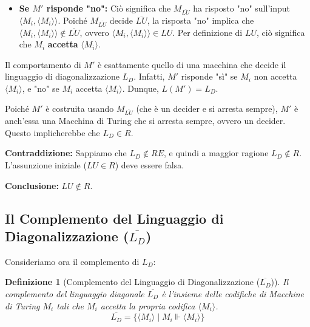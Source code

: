 \documentclass[a4paper]{article}
\makeatletter
\newtheorem{definition}{Definizione}[section] %
\renewenvironment{proof}[1][\proofname]{\par
  \pushQED{\qed}%
  \normalfont \topsep6\p@\@plus6\p@\relax
  \trivlist
  \item[\hskip\labelsep
        \bfseries
    #1\@addpunct{.}]\ignorespaces
}{%
  \popQED\endtrivlist\@endpefalse
}
\makeatother
\begin{document}
\begin{proof}
\begin{itemize}
    Poiché $M_{\overline{LU}}$ decide $\overline{LU}$, la risposta "sì" implica che $\langle M_i, \langle M_i \rangle \rangle \in \overline{LU}$.
    Per definizione di $\overline{LU}$, ciò significa che $M_i$ \textbf{non accetta} $\langle M_i \rangle$.
    \item \textbf{Se $M'$ risponde "no":}
    Ciò significa che $M_{\overline{LU}}$ ha risposto "no" sull'input $\langle M_i, \langle M_i \rangle \rangle$.
    Poiché $M_{\overline{LU}}$ decide $\overline{LU}$, la risposta "no" implica che $\langle M_i, \langle M_i \rangle \rangle \notin \overline{LU}$, ovvero $\langle M_i, \langle M_i \rangle \rangle \in LU$.
    Per definizione di $LU$, ciò significa che $M_i$ \textbf{accetta} $\langle M_i \rangle$.
\end{itemize}
Il comportamento di $M'$ è esattamente quello di una macchina che decide il linguaggio di diagonalizzazione $L_D$. Infatti, $M'$ risponde "sì" se $M_i$ non accetta $\langle M_i \rangle$, e "no" se $M_i$ accetta $\langle M_i \rangle$. Dunque, $L(M') = L_D$.

Poiché $M'$ è costruita usando $M_{\overline{LU}}$ (che è un decider e si arresta sempre), $M'$ è anch'essa una Macchina di Turing che si arresta sempre, ovvero un decider. Questo implicherebbe che $L_D \in R$.

\textbf{Contraddizione:} Sappiamo che $L_D \notin RE$, e quindi a maggior ragione $L_D \notin R$.
L'assunzione iniziale ($LU \in R$) deve essere falsa.

\textbf{Conclusione:} $LU \notin R$.
\end{proof}

\subsection{Il Complemento del Linguaggio di Diagonalizzazione ($\overline{L_D}$)}
Consideriamo ora il complemento di $L_D$:
\begin{definition}[Complemento del Linguaggio di Diagonalizzazione ($\overline{L_D}$)]
Il complemento del linguaggio diagonale $\overline{L_D}$ è l'insieme delle codifiche di Macchine di Turing $M_i$ tali che $M_i$ accetta la propria codifica $\langle M_i \rangle$.
\[ \overline{L_D} = \{ \langle M_i \rangle \mid M_i \Vdash \langle M_i \rangle \} \]
\end{definition}
\end{document}
